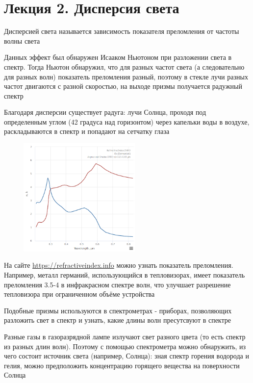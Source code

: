 \section{Лекция 2. Дисперсия света}

Дисперсией света называется зависимость показателя преломления от частоты волны света

Данных эффект был обнаружен Исааком Ньютоном при разложении света в спектр. Тогда Ньютон обнаружил, что для разных частот света (а следовательно для разных волн) показатель преломления разный, поэтому в стекле лучи разных частот двигаются с разной скоростью, на выходе призмы получается радужный спектр 

Благодаря дисперсии существует радуга: лучи Солнца, проходя под определенным углом (42 градуса над горизонтом) через капельки воды в воздухе, раскладываются в спектр и попадают на сетчатку глаза

\begin{figure}
    \includegraphics[width=6cm]{physics3/images/physics3_germanium_refractive_index}
\end{figure}

На сайте \url{https://refractiveindex.info} можно узнать показатель преломления. Например, металл германий, использующийся в тепловизорах, имеет показатель преломления 3.5-4 в инфракрасном спектре волн, что улучшает разрешение тепловизора при ограниченном объёме устройства

Подобные призмы используются в спектрометрах - приборах, позволяющих разложить свет в спектр и узнать, какие длины волн пресутсвуют в спектре

Разные газы в газоразрядной лампе излучают свет разного цвета (то есть спектр из разных длин волн). Поэтому с помощью спектрометра можно обнаружить, из чего состоит источник света (например, Солнца): зная спектр горения водорода и гелия, можно предположить концентрацию горящего вещества на поверхности Солнца

